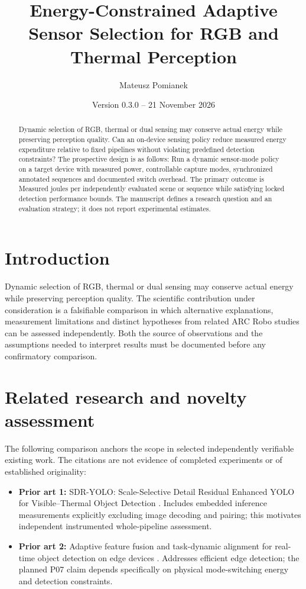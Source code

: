 \documentclass[11pt,a4paper]{article}
\title{Energy-Constrained Adaptive Sensor Selection for RGB and Thermal Perception}
\author{Mateusz Pomianek}
\date{Version 0.3.0 -- 21 November 2026}
\begin{document}
\maketitle

\begin{abstract}
Dynamic selection of RGB, thermal or dual sensing may conserve actual energy while preserving perception quality. Can an on-device sensing policy reduce measured energy expenditure relative to fixed pipelines without violating predefined detection constraints? The prospective design is as follows: Run a dynamic sensor-mode policy on a target device with measured power, controllable capture modes, synchronized annotated sequences and documented switch overhead. The primary outcome is Measured joules per independently evaluated scene or sequence while satisfying locked detection performance bounds. The manuscript defines a research question and an evaluation strategy; it does not report experimental estimates.
\end{abstract}

\section{Introduction}
Dynamic selection of RGB, thermal or dual sensing may conserve actual energy while preserving perception quality. The scientific contribution under consideration is a falsifiable comparison in which alternative explanations, measurement limitations and distinct hypotheses from related ARC Robo studies can be assessed independently. Both the source of observations and the assumptions needed to interpret results must be documented before any confirmatory comparison.

\section{Related research and novelty assessment}
The following comparison anchors the scope in selected independently verifiable existing work. The citations are not evidence of completed experiments or of established originality:
\begin{itemize}
\item \textbf{Prior art 1:} SDR-YOLO: Scale-Selective Detail Residual Enhanced YOLO for Visible--Thermal Object Detection \cite{source1}. Includes embedded inference measurements explicitly excluding image decoding and pairing; this motivates independent instrumented whole-pipeline assessment.
\item \textbf{Prior art 2:} Adaptive feature fusion and task-dynamic alignment for real-time object detection on edge devices \cite{source2}. Addresses efficient edge detection; the planned P07 claim depends specifically on physical mode-switching energy and detection constraints.
\end{itemize}
\end{document}
